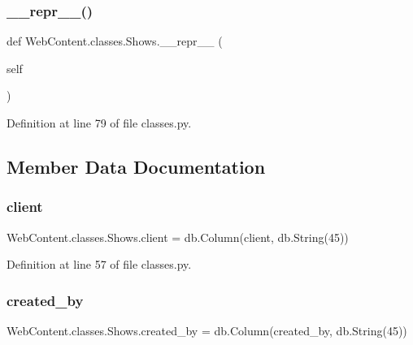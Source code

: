 \subsubsection{\texorpdfstring{\+\_\+\+\_\+repr\+\_\+\+\_\+()}{\_\_repr\_\_()}}
{\footnotesize\ttfamily def Web\+Content.\+classes.\+Shows.\+\_\+\+\_\+repr\+\_\+\+\_\+ (\begin{DoxyParamCaption}\item[{}]{self }\end{DoxyParamCaption})}



Definition at line 79 of file classes.\+py.



\subsection{Member Data Documentation}
\mbox{\label{class_web_content_1_1classes_1_1_shows_ad95c8895e4633584f7da017e2b79f45d}} 
\subsubsection{\texorpdfstring{client}{client}}
{\footnotesize\ttfamily Web\+Content.\+classes.\+Shows.\+client = db.\+Column(\textquotesingle{}client\textquotesingle{}, db.\+String(45))\hspace{0.3cm}{\ttfamily [static]}}



Definition at line 57 of file classes.\+py.

\mbox{\label{class_web_content_1_1classes_1_1_shows_a1c11f5ef467e4230b4672c40cd7268fe}} 
\subsubsection{\texorpdfstring{created\+\_\+by}{created\_by}}
{\footnotesize\ttfamily Web\+Content.\+classes.\+Shows.\+created\+\_\+by = db.\+Column(\textquotesingle{}created\+\_\+by\textquotesingle{}, db.\+String(45))\hspace{0.3cm}{\ttfamily [static]}}



